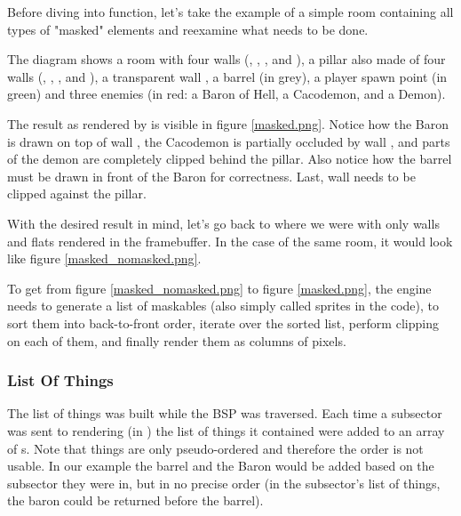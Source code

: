 Before diving into  function, let's take the example of a simple room containing all types of "masked" elements and reexamine what needs to be done.\\
\par
The diagram shows a room with four walls (, , , and ), a pillar also made of four walls (, , , and ), a transparent wall , a barrel (in grey), a player spawn point (in green) and three enemies (in red: a Baron of Hell, a Cacodemon, and a Demon).\\
\par
The result as rendered by \doom{} is visible in figure \ref{masked.png}. Notice how the Baron is drawn on top of wall , the Cacodemon is partially occluded by wall , and parts of the demon are completely clipped behind the pillar. Also notice how the barrel must be drawn in front of the Baron for correctness. Last, wall  needs to be clipped against the pillar.\\
\par
{}
\par
With the desired result in mind, let's go back to where we were with only walls and flats rendered in the framebuffer. In the case of the same room, it would look like figure \ref{masked_nomasked.png}.\\
\par
{}
\par
To get from figure \ref{masked_nomasked.png} to figure \ref{masked.png}, the engine needs to generate a list of maskables (also simply called sprites in the code), to sort them into back-to-front order, iterate over the sorted list, perform clipping on each of them, and finally render them as columns of pixels.\\
\par
\subsubsection{List Of Things}
 The list of things was built while the BSP was traversed. Each time a subsector was sent to rendering (in ) the list of things it contained were added to an array of s. Note that things are only pseudo-ordered and therefore the order is not usable. In our example the barrel and the Baron would be added based on the subsector they were in, but in no precise order (in the subsector's list of things, the baron could be returned before the barrel).\\
 \par
